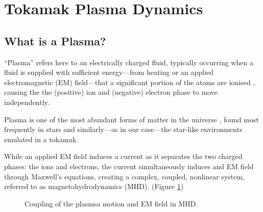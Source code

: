 \section{Tokamak  Plasma Dynamics}
    \subsection{What is a Plasma?}
        \begin{definition}[Plasma]
            ``Plasma'' refers here to an electrically charged fluid, typically occurring when a fluid is supplied with sufficient energy—from heating or an applied electromagnetic (EM) field—that a significant portion of the atoms  are ionised , causing the the (positive) ion and (negative) electron phase to move independently.
        \end{definition}
        
        Plasma is one of the most abundant forms of matter in the universe \cite{CL13}, found most frequently in stars \cite{Phi95, Asc06, Pie17} and similarly—as in our case—the star-like environments emulated in a tokamak.
        
        While an applied EM field induces a current as it separates the two charged phases: the ions and electrons, the current simultaneously induces and EM field through Maxwell's equations, creating a complex, coupled, nonlinear system, referred to as magnetohydrodynamics (MHD). (Figure \ref{MHD coupling}) \BA{[Ref.]}
        
        \begin{figure}[!h]
            \centering
            \caption{Coupling of the plasmsa motion and EM field in MHD.}
            \label{MHD coupling}
        \end{figure}
    
